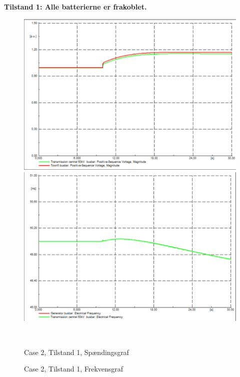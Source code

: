 \textbf{Tilstand 1: Alle batterierne er frakoblet.}
\begin{figure}[H]
	\centering
	\begin{minipage}[b]{0.48\textwidth}
		\centering
		\includegraphics[width=1.00\textwidth]{figurer/LossOfTown/Voltage1} %
	\end{minipage}
	\hfill
	\begin{minipage}[b]{0.48\textwidth}
		\centering
		\includegraphics[width=1.00\textwidth]{figurer/LossOfTown/Freq1} %
	\end{minipage}
	\\ %
	\begin{minipage}[t]{0.48\textwidth}
		\caption{Case 2, Tilstand 1, Spændingsgraf} %
		\label{fig:C2T1V}
	\end{minipage}
	\hfill
	\begin{minipage}[t]{0.48\textwidth}
		\caption{Case 2, Tilstand 1, Frekvensgraf} %
		\label{fig:C2T1F}
	\end{minipage}
\end{figure}


